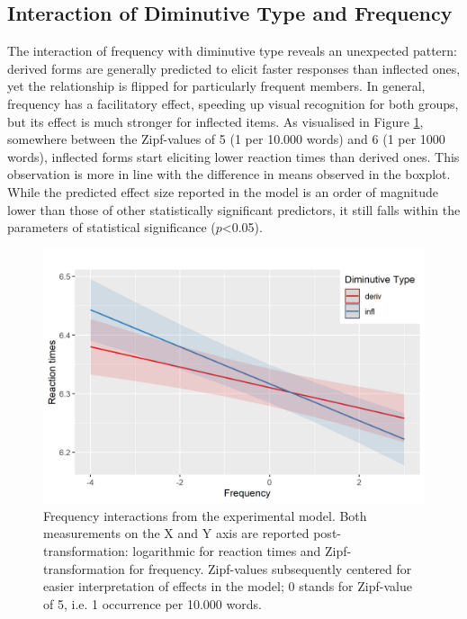 \subsection{Interaction of Diminutive Type and Frequency} \label{subsec:interaction}
The interaction of frequency with diminutive type reveals an unexpected pattern: derived forms are generally predicted to elicit faster responses than inflected ones, yet the relationship is flipped for particularly frequent members. In general, frequency has a facilitatory effect, speeding up visual recognition for both groups, but its effect is much stronger for inflected items. As visualised in Figure \ref{fig:interaction}, somewhere between the Zipf-values of 5 (1 per 10.000 words) and 6 (1 per 1000 words), inflected forms start eliciting lower reaction times than derived ones. This observation is more in line with the difference in means observed in the boxplot. While the predicted effect size reported in the model is an order of magnitude lower than those of other statistically significant predictors, it still falls within the parameters of statistical significance ($p$<0.05).
\begin{figure}[h]
    \centering
    \includegraphics[width=\textwidth]{images/mod_int.png}
    \caption[Frequency interactions from the experimental model]{Frequency interactions from the experimental model. Both measurements on the X and Y axis are reported post-transformation: logarithmic for reaction times and Zipf-transformation for frequency. Zipf-values subsequently centered for easier interpretation of effects in the model; 0 stands for Zipf-value of 5, i.e. 1 occurrence per 10.000 words.}
    \label{fig:interaction}
\end{figure}
